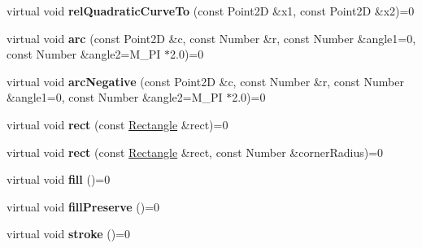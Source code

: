 \begin{DoxyCompactItemize}
\item 
\hypertarget{classsambag_1_1disco_1_1_i_draw_context_a77bd901126df3c89ae1b7a61b8b11738}{
virtual void {\bfseries relQuadraticCurveTo} (const Point2D \&x1, const Point2D \&x2)=0}
\label{classsambag_1_1disco_1_1_i_draw_context_a77bd901126df3c89ae1b7a61b8b11738}

\item 
\hypertarget{classsambag_1_1disco_1_1_i_draw_context_a12295a2b8a087f850f289cffda40c36a}{
virtual void {\bfseries arc} (const Point2D \&c, const Number \&r, const Number \&angle1=0, const Number \&angle2=M\_\-PI $\ast$2.0)=0}
\label{classsambag_1_1disco_1_1_i_draw_context_a12295a2b8a087f850f289cffda40c36a}

\item 
\hypertarget{classsambag_1_1disco_1_1_i_draw_context_a946ff541d9bbb1f932d69e6168113f35}{
virtual void {\bfseries arcNegative} (const Point2D \&c, const Number \&r, const Number \&angle1=0, const Number \&angle2=M\_\-PI $\ast$2.0)=0}
\label{classsambag_1_1disco_1_1_i_draw_context_a946ff541d9bbb1f932d69e6168113f35}

\item 
\hypertarget{classsambag_1_1disco_1_1_i_draw_context_a91ee5cf9e5910ad7994ba2769c5e3b5f}{
virtual void {\bfseries rect} (const \hyperlink{classsambag_1_1com_1_1_rectangle}{Rectangle} \&rect)=0}
\label{classsambag_1_1disco_1_1_i_draw_context_a91ee5cf9e5910ad7994ba2769c5e3b5f}

\item 
\hypertarget{classsambag_1_1disco_1_1_i_draw_context_a5bfd53d10fc94f4a837d9a1c50c40a1f}{
virtual void {\bfseries rect} (const \hyperlink{classsambag_1_1com_1_1_rectangle}{Rectangle} \&rect, const Number \&cornerRadius)=0}
\label{classsambag_1_1disco_1_1_i_draw_context_a5bfd53d10fc94f4a837d9a1c50c40a1f}

\item 
\hypertarget{classsambag_1_1disco_1_1_i_draw_context_a6bd68f0eebceec0e50fd361e6e39a7ca}{
virtual void {\bfseries fill} ()=0}
\label{classsambag_1_1disco_1_1_i_draw_context_a6bd68f0eebceec0e50fd361e6e39a7ca}

\item 
\hypertarget{classsambag_1_1disco_1_1_i_draw_context_a2bdaa26eaa7281ee9ca9b398c70e3962}{
virtual void {\bfseries fillPreserve} ()=0}
\label{classsambag_1_1disco_1_1_i_draw_context_a2bdaa26eaa7281ee9ca9b398c70e3962}

\item 
\hypertarget{classsambag_1_1disco_1_1_i_draw_context_abfe5f2a85bfda41886ba10d2c3ef20ca}{
virtual void {\bfseries stroke} ()=0}
\label{classsambag_1_1disco_1_1_i_draw_context_abfe5f2a85bfda41886ba10d2c3ef20ca}


\end{DoxyCompactItemize}
